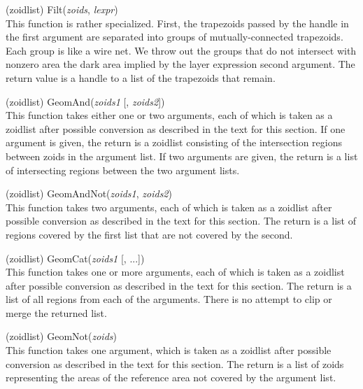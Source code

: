 \begin{description}
\item{(zoidlist) \vt Filt({\it zoids}, {\it lexpr\/})}\\
This function is rather specialized.  First, the trapezoids passed by
the handle in the first argument are separated into groups of
mutually-connected trapezoids.  Each group is like a wire net.  We
throw out the groups that do not intersect with nonzero area the dark
area implied by the layer expression second argument.  The return
value is a handle to a list of the trapezoids that remain.

\item{(zoidlist) \vt GeomAnd({\it zoids1} [, {\it zoids2\/}])}\\
This function takes either one or two arguments, each of which is
taken as a zoidlist after possible conversion as described in the text
for this section.  If one argument is given, the return is a zoidlist
consisting of the intersection regions between zoids in the argument
list.  If two arguments are given, the return is a list of
intersecting regions between the two argument lists.

\item{(zoidlist) \vt GeomAndNot({\it zoids1}, {\it zoids2\/})}\\
This function takes two arguments, each of which is taken as a
zoidlist after possible conversion as described in the text for this
section.  The return is a list of regions covered by the first list
that are not covered by the second.

\item{(zoidlist) \vt GeomCat({\it zoids1} [, ...])}\\
This function takes one or more arguments, each of which is taken as a
zoidlist after possible conversion as described in the text for this
section.  The return is a list of all regions from each of the
arguments.  There is no attempt to clip or merge the returned list.

\item{(zoidlist) \vt GeomNot({\it zoids\/})}\\
This function takes one argument, which is taken as a zoidlist after
possible conversion as described in the text for this section.  The
return is a list of zoids representing the areas of the reference area
not covered by the argument list.


\end{description}
